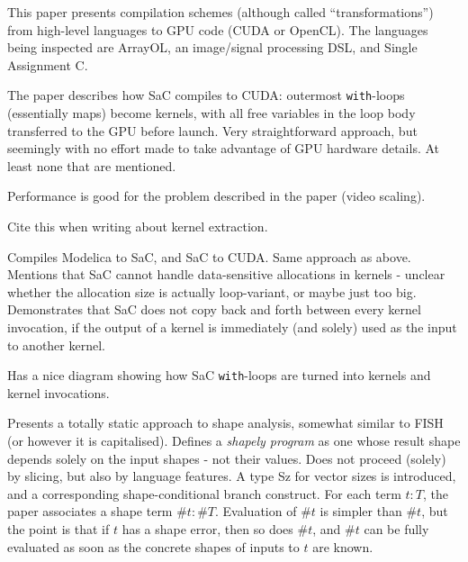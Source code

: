 \documentclass[a4paper, oneside, final]{memoir}
\begin{document}
\begin{quote}
\end{quote}

This paper presents compilation schemes (although called
``transformations'') from high-level languages to GPU code (CUDA or
OpenCL).  The languages being inspected are ArrayOL, an image/signal
processing DSL, and Single Assignment C.

The paper describes how SaC compiles to CUDA: outermost
\texttt{with}-loops (essentially maps) become kernels, with all free
variables in the loop body transferred to the GPU before launch.  Very
straightforward approach, but seemingly with no effort made to take
advantage of GPU hardware details.  At least none that are mentioned.

Performance is good for the problem described in the paper (video
scaling).

Cite this when writing about kernel extraction.

\begin{quote}
\end{quote}

Compiles Modelica to SaC, and SaC to CUDA.  Same approach as above.
Mentions that SaC cannot handle data-sensitive allocations in kernels
- unclear whether the allocation size is actually loop-variant, or
maybe just too big.  Demonstrates that SaC does not copy back and
forth between every kernel invocation, if the output of a kernel is
immediately (and solely) used as the input to another kernel.

Has a nice diagram showing how SaC \texttt{with}-loops are turned into
kernels and kernel invocations.

\begin{quote}
\end{quote}

Presents a totally static approach to shape analysis, somewhat similar
to FISH (or however it is capitalised).  Defines a \textit{shapely
  program} as one whose result shape depends solely on the input
shapes - not their values.  Does not proceed (solely) by slicing, but
also by language features.  A type Sz for vector sizes is introduced,
and a corresponding shape-conditional branch construct.  For each term
$t : T$, the paper associates a shape term $\#t : \#T$.  Evaluation of
$\#t$ is simpler than $\#t$, but the point is that if $t$ has a shape
error, then so does $\#t$, and $\#t$ can be fully evaluated as soon as
the concrete shapes of inputs to $t$ are known.
\end{document}
